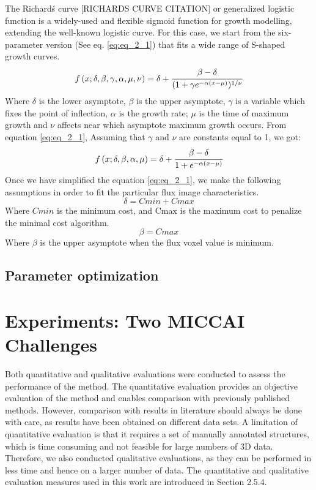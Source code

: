 The Richard\'s curve [RICHARDS CURVE CITATION] or generalized logistic function is a widely-used and flexible sigmoid function for growth modelling, extending the well-known logistic curve. For this case, we start from the six-parameter version (See eq. \ref{eq:eq_2_1}) that fits a wide range of S-shaped growth curves. 
\begin{equation}
\label{eq:eq_2_1}
f\left( x;\delta,\beta,\gamma,\alpha,\mu,\nu\right) = \delta + \cfrac{\beta-\delta}{(1+\gamma e^{-\alpha(x-\mu)})^{1/\nu}}
\end{equation}
Where $\delta$ is the lower asymptote, $\beta$ is the upper asymptote, $\gamma$ is a variable which fixes the point of inflection, $\alpha$ is the growth rate; $\mu$ is the time of maximum growth and $\nu$ affects near which asymptote maximum growth occurs.
From equation \ref{eq:eq_2_1}, Assuming that $\gamma$ and $\nu$ are constants equal to 1, we got:
\begin{equation}
\label{eq:eq_2_2}
f\left( x;\delta,\beta,\alpha,\mu\right) = \delta + \cfrac{\beta-\delta}{1+e^{-\alpha(x-\mu)}}
\end{equation}
Once we have simplified the equation \ref{eq:eq_2_1}, we make the following assumptions in order to fit the particular flux image characteristics.
\begin{equation}
\label{eq:eq_2_3}
\delta = Cmin + Cmax
\end{equation}
Where $Cmin$ is the minimum cost, and Cmax is the maximum cost to penalize the minimal cost algorithm. 
\begin{equation}
\label{eq:eq_2_4}
\beta = Cmax
\end{equation}
Where $\beta$ is the upper asymptote when the flux voxel value is minimum.

\subsection{Parameter optimization}

\section{Experiments: Two MICCAI Challenges}

Both quantitative and qualitative evaluations were conducted to assess the performance of the method. The quantitative evaluation provides an objective evaluation of the method and enables comparison with previously published methods. However, comparison with results in literature should always be done with care, as results have been obtained on different data sets. A limitation of quantitative evaluation is that it requires a set of manually annotated structures, which is time consuming and not feasible for large numbers of 3D data. Therefore, we also conducted qualitative evaluations, as they can be performed in less time and hence on a larger number of data. The quantitative and qualitative evaluation measures used in this work are introduced in Section 2.5.4.

